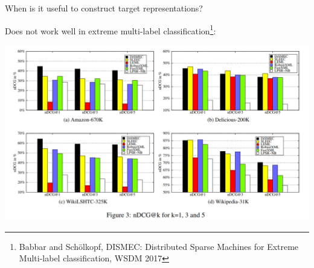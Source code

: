 \documentclass[]{beamer}
\begin{document}
%

\begin{frame}{When is it useful to construct target representations?}
\begin{center}
Does not work well in extreme multi-label classification\footnote{Babbar and Sch\"olkopf, DISMEC: Distributed Sparse Machines for Extreme Multi-label classification, WSDM 2017}:

\includegraphics[scale=0.3]{Figures/dismec} 
\end{center}
\end{frame}
\end{document}
